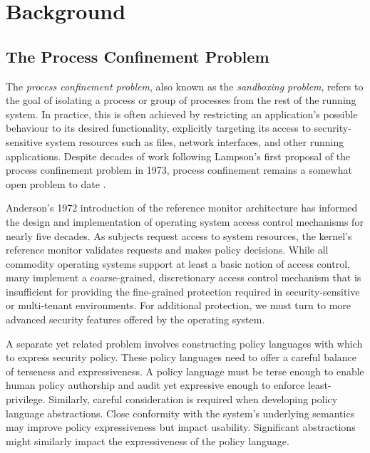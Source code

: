 \section{Background}

\subsection{The Process Confinement Problem}

The \textit{process confinement problem}, also known as the \textit{sandboxing problem}, refers to the goal of isolating a process or group of processes from the rest of the running system. In practice, this is often achieved by restricting an application's possible behaviour to its desired functionality, explicitly targeting its access to security-sensitive system resources such as files, network interfaces, and other running applications.  Despite decades of work following Lampson's \cite{lampson1973_a_note} first proposal of the process confinement problem in 1973, process confinement remains a somewhat open problem to date \cite{crowell2013_confinement_problem}.

Anderson's 1972 introduction of the reference monitor architecture \cite{anderson1973_planning_study}  has informed the design and implementation of operating system access control mechanisms for nearly five decades. As subjects request access to system resources, the kernel's reference monitor validates requests and makes policy decisions. While all commodity operating systems support at least a basic notion of access control, many implement a coarse-grained, discretionary access control mechanism that is insufficient for providing the fine-grained protection required in security-sensitive or multi-tenant environments. For additional protection, we must turn to more advanced security features offered by the operating system.

A separate yet related problem involves constructing policy languages with which to express security policy. These policy languages need to offer a careful balance of terseness and expressiveness. A policy language must be terse enough to enable human policy authorship and audit yet expressive enough to enforce least-privilege. Similarly, careful consideration is required when developing policy language abstractions. Close conformity with the system's underlying semantics may improve policy expressiveness but impact usability. Significant abstractions might similarly impact the expressiveness of the policy language.

